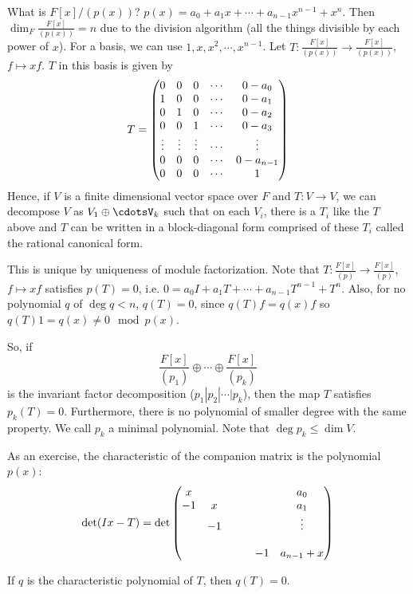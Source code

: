 \documentclass[a4paper,twoside,master.tex]{subfiles}
\begin{document}
What is $ F[x]/(p(x)) $? $ p(x) = a_0 + a_1 x + \cdots + a_{n-1} x^{n-1} + x^n $. Then $ \dim_F \frac{F[x]}{(p(x))} = n $ due to the division algorithm (all the things divisible by each power of $ x $). For a basis, we can use $ 1, x, x^2, \cdots, x^{n-1} $. Let $ T\colon \frac{F[x]}{(p(x))} \to \frac{F[x]}{(p(x))} $, $ f \mapsto x f $. $ T $ in this basis is given by
\begin{equation}
    T = \mqty(0&0&0&\cdots&0-a_0\\1&0&0&\cdots&0-a_1\\0&1&0&\cdots&0-a_2\\0&0&1&\cdots&0-a_3\\\vdots&\vdots&\vdots&\cdots&\vdots\\0&0&0&\cdots&0-a_{n-1}\\0&0&0&\cdots&1)
\end{equation}
Hence, if $ V $ is a finite dimensional vector space over $ F $ and $ T\colon V \to V $, we can decompose $ V $ as $ V_1 \oplus \cdotsV_k $ such that on each $ V_i $, there is a $ T_i $ like the $ T $ above and $ T $ can be written in a block-diagonal form comprised of these $ T_i $ called the rational canonical form.

This is unique by uniqueness of module factorization. Note that $ T\colon \frac{F[x]}{(p)} \to \frac{F[x]}{(p)} $, $ f \mapsto x f $ satisfies $ p(T) = 0 $, i.e. $ 0 = a_0 I + a_1 T + \cdots + a_{n-1} T^{n-1} + T^n $. Also, for no polynomial $ q $ of $ \deg q < n $, $ q(T) = 0 $, since $ q(T) f = q(x) f $ so $ q(T) 1 = q(x) \neq 0 \mod p(x) $.

So, if
\begin{equation}
    \frac{F[x]}{(p_1)} \oplus \cdots \oplus \frac{F[x]}{(p_k)}
\end{equation}
is the invariant factor decomposition ($ p_1 | p_2 | \cdots | p_k $), then the map $ T $ satisfies $ p_k(T) = 0 $. Furthermore, there is no polynomial of smaller degree with the same property. We call $ p_k $ a minimal polynomial. Note that $ \deg p_k \leq \dim V $. 

As an exercise, the characteristic of the companion matrix is the polynomial $ p(x) $:
\begin{equation}
    \det(Ix - T) = \det \mqty(x&&&&&a_0\\-1&x&&&&a_1\\&-1&&&&\vdots\\\\&&&&-1&a_{n-1} + x)
\end{equation}

\begin{corollary}
    If $ q $ is the characteristic polynomial of $ T $, then $ q(T) = 0 $.
\end{corollary}
\end{document}

